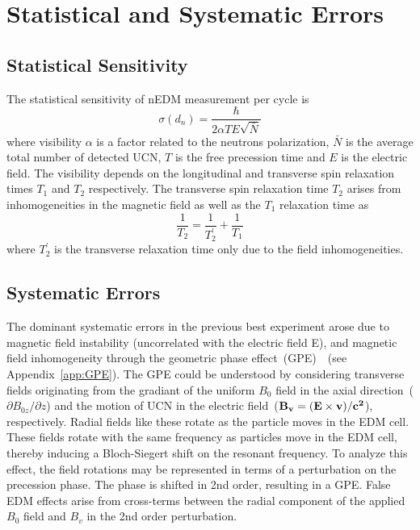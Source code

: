 \section{Statistical and Systematic Errors}
\subsection{Statistical Sensitivity}
The statistical sensitivity of nEDM measurement per cycle is
\begin{equation}
  \label{eqn:dnsensitivity}
\sigma(d_n) = \frac{\hbar}{2 \alpha T E \sqrt{\bar{N}}}
\end{equation}
where visibility $\alpha$ is a factor related to the neutrons
polarization, $\bar{N}$ is the average total number of detected UCN,
$T$ is the free precession time and $E$ is the electric field. The
visibility depends on the longitudinal and transverse spin relaxation
times $T_1$ and $T_2$ respectively. The transverse spin relaxation
time $T_2$ arises from inhomogeneities in the magnetic field as well
as the $T_1$ relaxation time as
\begin{equation}
\frac{1}{T_2} = \frac{1}{T_2^{\prime}}+\frac{1}{T_1}
\end{equation}
where $T_2^{\prime}$ is the transverse relaxation time only
due to the field inhomogeneities.

\subsection{Systematic Errors}
The dominant systematic errors in the previous best experiment arose
due to magnetic field instability (uncorrelated with the electric
field E), and magnetic field inhomogeneity through the geometric phase
effect~(GPE)~\cite{pendlebury2004}~(see Appendix~\ref{app:GPE}).
The GPE could be understood by considering transverse fields
originating from the gradiant of the uniform $B_0$ field in the axial
direction~($\partial{B_{0z}}/\partial{z}$) and the motion of UCN in
the electric field~($\bf{B_v} =(\bf{E} \times \bf{v})/c^2 $),
respectively. Radial fields like these rotate as the particle moves in
the EDM cell.  These fields rotate with the same frequency as
particles move in the EDM cell, thereby inducing a Bloch-Siegert shift
on the resonant frequency. To analyze this effect, the field rotations
may be represented in terms of a perturbation on the precession
phase. The phase is shifted in 2nd order, resulting in a GPE. False
EDM effects arise from cross-terms between the radial component of the
applied $B_0$ field and $B_v$ in the 2nd order perturbation.

